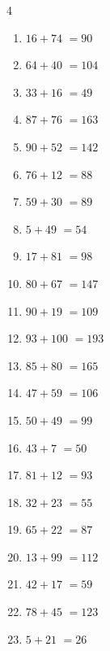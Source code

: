 \begin{multicols}{4}
\begin{enumerate}
  \item $16+74$
        $=90$

  \item $64+40$
        $=104$

  \item $33+16$
        $=49$

  \item $87+76$
        $=163$

  \item $90+52$
        $=142$

  \item $76+12$
        $=88$

  \item $59+30$
        $=89$

  \item $5+49$
        $=54$

  \item $17+81$
        $=98$

  \item $80+67$
        $=147$

  \item $90+19$
        $=109$

  \item $93+100$
        $=193$

  \item $85+80$
        $=165$

  \item $47+59$
        $=106$

  \item $50+49$
        $=99$

  \item $43+7$
        $=50$

  \item $81+12$
        $=93$

  \item $32+23$
        $=55$

  \item $65+22$
        $=87$

\columnbreak %

  \item $13+99$
        $=112$

  \item $42+17$
        $=59$

  \item $78+45$
        $=123$

  \item $5+21$
        $=26$


\end{enumerate}
\end{multicols}
